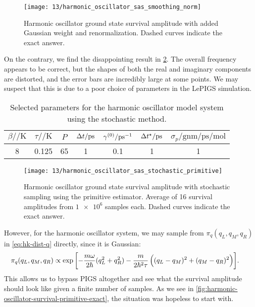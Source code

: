 \begin{figure}
	\centering
	\texttt{[image: 13/harmonic\_oscillator\_sas\_smoothing\_norm]}
	\caption[
		Harmonic oscillator survival amplitude with added Gaussian weight
	]{
		Harmonic oscillator ground state survival amplitude with added Gaussian weight and renormalization.
		Dashed curves indicate the exact answer.
	}
	\label{fig:harmonic-oscillator-survival-smoothing-norm}
\end{figure}

On the contrary, we find the disappointing result in \cref{fig:harmonic-oscillator-survival-primitive}.
The overall frequency appears to be correct, but the shapes of both the real and imaginary components are distorted, and the error bars are incredibly large at some points.
We may suspect that this is due to a poor choice of parameters in the LePIGS simulation.

\begin{table}
	\begin{center}
	\begin{tabular}{ c c c c c c c }
		\toprule
		{$\beta / \si{\per\kelvin}$} & {$\tau / \si{\per\kelvin}$} & {$P$} & {$\dt / \si{\pico\second}$} & $\gamma\bead{0} / \si{\per\pico\second}$ & {$\dt\alt / \si{\pico\second}$} & {$\sigma_p / \si{\gram\nano\meter\per\pico\second\per\mole}$} \\
		\midrule
		8 & 0.125 & 65 & 1 & 0.1 & 1 & 1 \\
		\bottomrule
	\end{tabular}
	\end{center}
	\caption[
		Selected parameters for harmonic oscillator (stochastic)
	]{
		Selected parameters for the harmonic oscillator model system using the stochastic method.
	}
	\label{tab:model-sas-harmonic-oscillator-stochastic}
\end{table}

\begin{figure}
	\centering
	\texttt{[image: 13/harmonic\_oscillator\_sas\_stochastic\_primitive]}
	\caption[
		Harmonic oscillator survival amplitude using primitive estimator
	]{
		Harmonic oscillator ground state survival amplitude with stochastic sampling using the primitive estimator.
		Average of 16 survival amplitudes from $\num{1e6}$ samples each.
		Dashed curves indicate the exact answer.
	}
	\label{fig:harmonic-oscillator-survival-primitive}
\end{figure}

However, for the harmonic oscillator system, we may sample from $\pi_q(q_L, q_M, q_R)$ in \cref{eq:hk-dist-q} directly, since it is Gaussian:
\begin{align}
	\pi_q(q_L, q_M, q_R)
	&\propto \exp{\left[ -\frac{m \omega}{2 \hbar} (q_L^2 + q_R^2) - \frac{m}{2 \hbar^2 \tau} \left( (q_L- q_M)^2 + (q_M- q_R)^2 \right) \right]}.
\end{align}
This allows us to bypass PIGS altogether and see what the survival amplitude should look like given a finite number of samples.
As we see in \cref{fig:harmonic-oscillator-survival-primitive-exact}, the situation was hopeless to start with.

